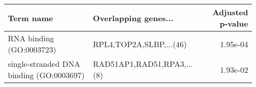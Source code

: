 \begin{tabular}{llr}
\toprule
                               Term name &       Overlapping genes... &  Adjusted p-value \\
\midrule
                RNA binding (GO:0003723) &    RPL4,TOP2A,SLBP,...(46) &          1.95e-04 \\
single-stranded DNA binding (GO:0003697) & RAD51AP1,RAD51,RPA3,...(8) &          1.93e-02 \\
\bottomrule
\end{tabular}
